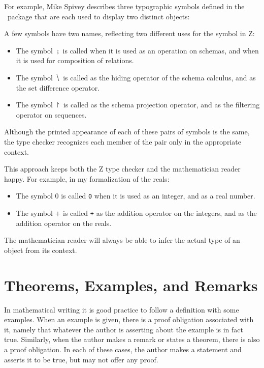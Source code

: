 \documentclass[11pt, oneside]{article}
\begin{document}
For example, Mike Spivey \cite{spivey-fm} describes three typographic symbols defined in the \fuzz\ package 
that are each used to display two distinct objects:
\begin{displayquote}
A few symbols have two names, reflecting two different uses for the
symbol in Z:
\begin{itemize}
\item The symbol $\semi$ is called 
 when it is used as an operation on schemas, and 
 when it is used for composition of relations.
\item The symbol $\hide$ is called
 as the hiding operator of the schema calculus, and 
 as the set difference operator. 
\item The symbol $\project$ is called
 as the schema projection operator, and 
 as the filtering operator on sequences.
\end{itemize}
Although the printed appearance of
each of these pairs of symbols is the same, the type checker
recognizes each member of the pair only in the appropriate
\hbox{context}.
\end{displayquote}
This approach keeps both the Z type checker and the mathematician reader happy.
For example, in my formalization of the reals:
\begin{itemize} 
\item The symbol $0$ is called 
\texttt{0} when it is used as an integer, and 
 as a real number.
\item The symbol $+$ is called 
\texttt{+} as the addition operator on the integers, and
 as the addition operator on the reals.
\end{itemize}
The mathematician reader will always be able to infer the actual type of an object from its context.

\section{Theorems, Examples, and Remarks}

In mathematical writing it is good practice to follow a definition with some examples.
When an example is given, there is a proof obligation associated with it,
namely that whatever the author is asserting about the example is in fact true.
Similarly, when the author makes a remark or states a theorem, there is also a proof obligation.
In each of these cases, the author makes a statement and asserts it to be true, but may not offer any proof.
\end{document}
